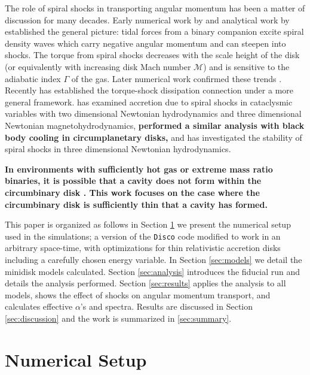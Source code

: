 \documentclass{emulateapj}
\newcommand{\Disco}{{\texttt{Disco}}}
\begin{document}
The role of spiral shocks in transporting angular momentum has been a matter of discussion for many decades.  Early numerical work by \cite{Sawada86} and analytical work by \cite{Spruit87} established the general picture: tidal forces from a binary companion excite spiral density waves which carry negative angular momentum and can steepen into shocks.  The torque from spiral shocks decreases with the scale height of the disk (or equivalently with increasing disk Mach number $\mathcal{M}$) and is sensitive to the adiabatic index $\Gamma$ of the gas.  Later numerical work confirmed these trends \citep{Godon98, Blondin00}.  Recently \cite{Rafikov16} has established the torque-shock dissipation connection under a more general framework.  \cite{Ju16} has examined accretion due to spiral shocks in cataclysmic variables with two dimensional Newtonian hydrodynamics and three dimensional Newtonian magnetohydrodynamics, {\bf \cite{Zhu16} performed a similar analysis with black body cooling in circumplanetary disks,} and \cite{Bae16} has investigated the stability of spiral shocks in three dimensional Newtonian hydrodynamics.

{\bf In environments with sufficiently hot gas or extreme mass ratio binaries, it is possible that a cavity does not form within the circumbinary disk \citep{delValle14,delValle15}. This work focuses on the case where the circumbinary disk is sufficiently thin that a cavity has formed.}

This paper is organized as follows in Section \ref{sec:numerics} we present the
numerical setup used in the simulations; a version of the \Disco{} code 
modified to work in an arbitrary space-time, with optimizations for thin 
relativistic accretion disks including a carefully chosen energy variable.  In Section \ref{sec:models} we detail the 
minidisk models calculated.  Section \ref{sec:analysis} introduces the fiducial run and details the analysis performed.  Section \ref{sec:results} applies the analysis to all models, shows the effect of shocks on angular momentum transport, and calculates effective $\alpha$'s and spectra. Results are discussed in Section \ref{sec:discussion} and the work is summarized in \ref{sec:summary}.



\section{Numerical Setup}
\label{sec:numerics}
\end{document}

